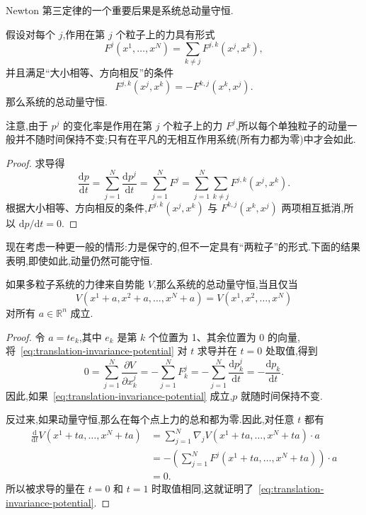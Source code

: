 Newton 第三定律的一个重要后果是系统总动量守恒.

\begin{proposition}[总动量守恒]\label{pro:total-momentum}
假设对每个 $j$,作用在第 $j$ 个粒子上的力具有形式
\[
  F^{j}(x^{1},\ldots,x^{N})=\sum_{k\neq j}F^{j,k}(x^{j},x^{k}),
\]
并且满足“大小相等、方向相反”的条件
\[
  F^{j,k}(x^{j},x^{k})=-F^{k,j}(x^{k},x^{j}).
\]
那么系统的总动量守恒.
\end{proposition}

注意,由于 $p^{j}$ 的变化率是作用在第 $j$ 个粒子上的力 $F^{j}$,所以每个单独粒子的动量一般并不随时间保持不变;只有在平凡的无相互作用系统(所有力都为零)中才会如此.

\begin{proof}
求导得
\[
  \frac{\mathrm{d}p}{\mathrm{d}t}
  =\sum_{j=1}^{N}\frac{\mathrm{d}p^{j}}{\mathrm{d}t}
  =\sum_{j=1}^{N}F^{j}
  =\sum_{j=1}^{N}\sum_{k\neq j}F^{j,k}(x^{j},x^{k}).
\]
根据大小相等、方向相反的条件,$F^{j,k}(x^{j},x^{k})$ 与 $F^{k,j}(x^{k},x^{j})$ 两项相互抵消,所以 $\mathrm{d}p/\mathrm{d}t=0$.
\end{proof}

现在考虑一种更一般的情形:力是保守的,但不一定具有“两粒子”的形式.下面的结果表明,即使如此,动量仍然可能守恒.

\begin{proposition}[平移不变性与动量守恒]\label{pro:translation-momentum}
如果多粒子系统的力律来自势能 $V$,那么系统的总动量守恒,当且仅当
\begin{equation}
  V(x^{1}+a,x^{2}+a,\ldots,x^{N}+a)=V(x^{1},x^{2},\ldots,x^{N})
  \label{eq:translation-invariance-potential}
\end{equation}
对所有 $a\in\mathbb{R}^{n}$ 成立.
\end{proposition}

\begin{proof}
令 $a=te_{k}$,其中 $e_{k}$ 是第 $k$ 个位置为 1、其余位置为 0 的向量,将~\eqref{eq:translation-invariance-potential} 对 $t$ 求导并在 $t=0$ 处取值,得到
\[
  0=\sum_{j=1}^{N}\frac{\partial V}{\partial x^{j}_{k}}
  =-\sum_{j=1}^{N}F^{j}_{k}
  =-\sum_{j=1}^{N}\frac{\mathrm{d}p^{j}_{k}}{\mathrm{d}t}
  =-\frac{\mathrm{d}p_{k}}{\mathrm{d}t}.
\]
因此,如果~\eqref{eq:translation-invariance-potential} 成立,$p$ 就随时间保持不变.

反过来,如果动量守恒,那么在每个点上力的总和都为零.因此,对任意 $t$ 都有
\begin{align*}
\frac{\mathrm{d}}{\mathrm{d}t}V(x^{1}+ta,\ldots,x^{N}+ta)
 &=\sum_{j=1}^{N}\nabla_{j}V(x^{1}+ta,\ldots,x^{N}+ta)\cdot a\\
 &=-\left(\sum_{j=1}^{N}F^{j}(x^{1}+ta,\ldots,x^{N}+ta)\right)\cdot a\\
 &=0.
\end{align*}
所以被求导的量在 $t=0$ 和 $t=1$ 时取值相同,这就证明了~\eqref{eq:translation-invariance-potential}.
\end{proof}

